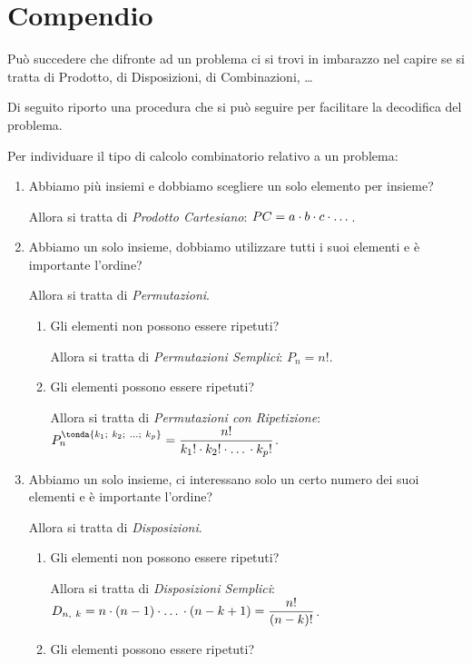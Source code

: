\section{Compendio}
\label{sec:calc_combinatoio_compendio}

Può succedere che difronte ad un problema ci si trovi in imbarazzo nel capire 
se si tratta di Prodotto, di Disposizioni, di Combinazioni, \dots

Di seguito riporto una procedura che si può seguire per facilitare la 
decodifica del problema.

\begin{procedura} Per individuare il tipo di calcolo combinatorio relativo a 
un problema:
\begin{enumerate} %
\item 
Abbiamo più insiemi e dobbiamo scegliere un solo elemento per insieme?

Allora si tratta di \emph{Prodotto Cartesiano}: \hfill 
\(PC = a \cdot b \cdot c \cdot \text{\dots}\).

\item 
Abbiamo un solo insieme, dobbiamo utilizzare tutti i suoi elementi e è 
importante l'ordine?

Allora si tratta di \emph{Permutazioni}.
\begin{enumerate}[nosep]
\item Gli elementi non possono essere ripetuti?

Allora si tratta di \emph{Permutazioni Semplici}: \hfill 
\(P_n = n!\).
\item Gli elementi possono essere ripetuti?

Allora si tratta di \emph{Permutazioni con Ripetizione}: \\ 
\phantom{0}\hfill
\(P_n^{\tonda{k_1;~k_2;~\dots;~k_p}} = 
  \dfrac{n!}{k_1!\cdot k_2! \cdot \text{\dots} \cdot k_p!}\).
\end{enumerate}

\item 
Abbiamo un solo insieme, ci interessano solo un certo numero dei suoi 
elementi e è importante l'ordine?

Allora si tratta di \emph{Disposizioni}.
\begin{enumerate}[nosep]
\item Gli elementi non possono essere ripetuti?

Allora si tratta di \emph{Disposizioni Semplici}: \\ 
\phantom{0}\hfill
\(D_{n,~k} = n\cdot (n-1) \cdot \text{\dots} \cdot (n-k+1) = 
\dfrac{n!}{(n-k)!}\).
\item Gli elementi possono essere ripetuti?


\end{enumerate}
\end{enumerate}
\end{procedura}
